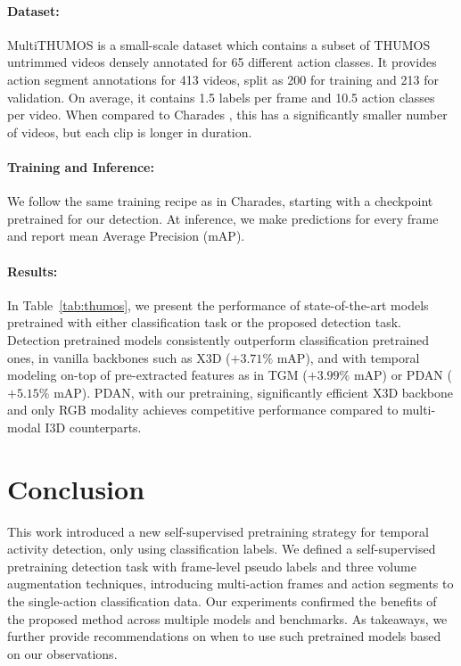 \documentclass[10pt,twocolumn,letterpaper]{article}
\newcommand{\tref}[1]{Table~\ref{#1}}
\begin{document}
\paragraph{Dataset:} MultiTHUMOS \cite{yeung2018every} is a small-scale dataset which contains a subset of THUMOS \cite{jiang2014thumos} untrimmed videos densely annotated for 65 different action classes. It provides action segment annotations for 413 videos, split as 200 for training and 213 for validation. On average, it contains 1.5 labels per frame and 10.5 action classes per video. When compared to Charades \cite{sigurdsson2016hollywood}, this has a significantly smaller number of videos, but each clip is longer in duration.

\vspace{-1.5mm}
\paragraph{Training and Inference:} We follow the same training recipe as in Charades, starting with a checkpoint pretrained for our detection. At inference, we make predictions for every frame and report mean Average Precision (mAP).
\vspace{-3pt}
\paragraph{Results:}
\label{subsubsec:main_results_thumos}

In \tref{tab:thumos}, we present the performance of state-of-the-art models pretrained with either classification task or the proposed detection task. Detection pretrained models consistently outperform classification pretrained ones, in vanilla backbones such as X3D \cite{feichtenhofer2020x3d} ($+3.71\%$ mAP), and with temporal modeling on-top of pre-extracted features as in TGM \cite{piergiovanni2019temporal} ($+3.99\%$ mAP) or PDAN \cite{dai2021pdan} ($+5.15\%$ mAP). PDAN, with our pretraining, significantly efficient X3D backbone and only RGB modality achieves competitive performance compared to multi-modal I3D \cite{carreira2017quo} counterparts.

\vspace{-2mm}


\section{Conclusion}
\label{sec:conclusion}
\vspace{-2mm}

This work introduced a new self-supervised pretraining strategy for temporal activity detection, only using classification labels. We defined a self-supervised pretraining detection task with frame-level pseudo labels and three volume augmentation techniques, introducing multi-action frames and action segments to the single-action classification data. Our experiments confirmed the benefits of the proposed method across multiple models and benchmarks. As takeaways, we further provide recommendations on when to use such pretrained models based on our observations.
\end{document}
